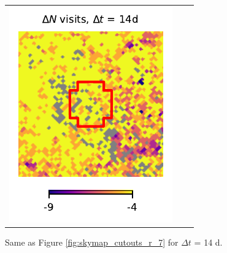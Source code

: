 \documentclass[preprintm,linenumbers]{aastex631}
\begin{document}
\begin{figure}
\begin{tabular}{  c c c}
				\includegraphics{results/skymaps_cutout/skymaps_cutout_delta_first_year_one_snap_v4_0_10yrs_db_noDD_noTwi_tscale-14_nside-256_doAllTemplateMetrics_reduceCount_r_GP_noDD_noTwi.pdf} \\
			\end{tabular}
			\caption{
				 Same as Figure \ref{fig:skymap_cutouts_r_7} for $\Delta t$ = 14 d.  
			}
   \label{fig:skymap_cutouts_r_14}
		\end{figure}
\end{document}
